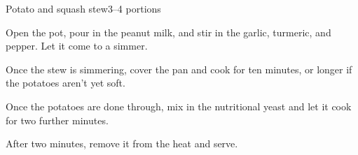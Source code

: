 \documentclass{article}
\begin{document}
\begin{recipe}{Potato and squash stew}{3--4 portions}
\begin{step}
\begin{stepdesc}
      \end{stepdesc}
    \end{step}
    \begin{step}
      \begin{ingrs}
      \end{ingrs}
      \begin{stepdesc}
        Open the pot, pour in the peanut milk, and stir in the garlic, turmeric, and pepper. Let it come to a simmer.
      \end{stepdesc}
    \end{step}
    \begin{step}
      \begin{ingrs}
      \end{ingrs}
      \begin{stepdesc}
        Once the stew is simmering, cover the pan and cook for ten minutes, or longer if the potatoes aren't yet soft.
      \end{stepdesc}
    \end{step}
    \begin{step}
      \begin{ingrs}
      \end{ingrs}
      \begin{stepdesc}
        Once the potatoes are done through, mix in the nutritional yeast and let it cook for two further minutes.
      \end{stepdesc}
    \end{step}
    \begin{step}
      \begin{ingrs}
      \end{ingrs}
      \begin{stepdesc}
        After two minutes, remove it from the heat and serve.
      \end{stepdesc}
    \end{step}
  \end{recipe}
\end{document}
